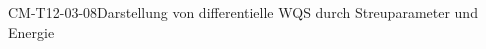
\begin{PROP}{CM-T12-03-08}{Darstellung von differentielle WQS durch Streuparameter und Energie}
\end{PROP}
